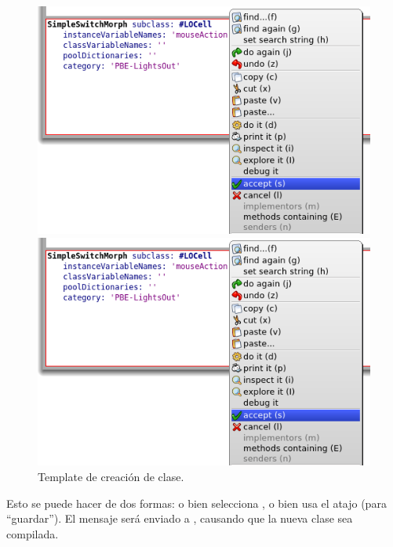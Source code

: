 \documentclass[a4paper,10pt,twoside]{book}
\begin{document}
\begin{figure}[h!t]
\ifluluelse
  {\centerline {\includegraphics[width=\textwidth]{AcceptClassDef}}}
  {\centerline {\includegraphics[scale=0.7]{AcceptClassDef}}}
\caption{Template de creación de clase.
}
\end{figure}


Esto se puede hacer de dos formas: o bien \actclicky selecciona , o bien
usa el atajo  (para ``guardar'').
El mensaje será enviado a , causando que la nueva clase sea compilada.
\end{document}
